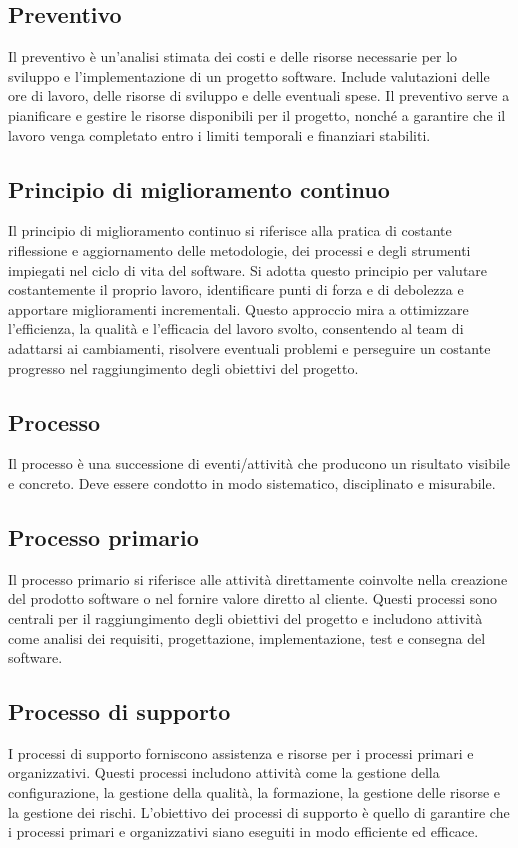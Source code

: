 \subsection{Preventivo} 
Il preventivo è un'analisi stimata dei costi e delle risorse necessarie per lo sviluppo e l'implementazione di un progetto software. Include valutazioni delle ore di lavoro, delle risorse di sviluppo e delle eventuali spese. Il preventivo serve a pianificare e gestire le risorse disponibili per il progetto, nonché a garantire che il lavoro venga completato entro i limiti temporali e finanziari stabiliti. 
\subsection{Principio di miglioramento continuo} 
Il principio di miglioramento continuo si riferisce alla pratica di costante riflessione e aggiornamento delle metodologie, dei processi e degli strumenti impiegati nel ciclo di vita del software. Si adotta questo principio per valutare costantemente il proprio lavoro, identificare punti di forza e di debolezza e apportare miglioramenti incrementali. Questo approccio mira a ottimizzare l'efficienza, la qualità e l'efficacia del lavoro svolto, consentendo al team di adattarsi ai cambiamenti, risolvere eventuali problemi e perseguire un costante progresso nel raggiungimento degli obiettivi del progetto. 
\subsection{Processo} 
Il processo è una successione di eventi/attività che producono un risultato visibile e concreto. Deve essere condotto in modo sistematico, disciplinato e misurabile.
\subsection{Processo primario} 
Il processo primario si riferisce alle attività direttamente coinvolte nella creazione del prodotto software o nel fornire valore diretto al cliente. Questi processi sono centrali per il raggiungimento degli obiettivi del progetto e includono attività come analisi dei requisiti, progettazione, implementazione, test e consegna del software.
\subsection{Processo di supporto} 
I processi di supporto forniscono assistenza e risorse per i processi primari e organizzativi. Questi processi includono attività come la gestione della configurazione, la gestione della qualità, la formazione, la gestione delle risorse e la gestione dei rischi. L'obiettivo dei processi di supporto è quello di garantire che i processi primari e organizzativi siano eseguiti in modo efficiente ed efficace.

